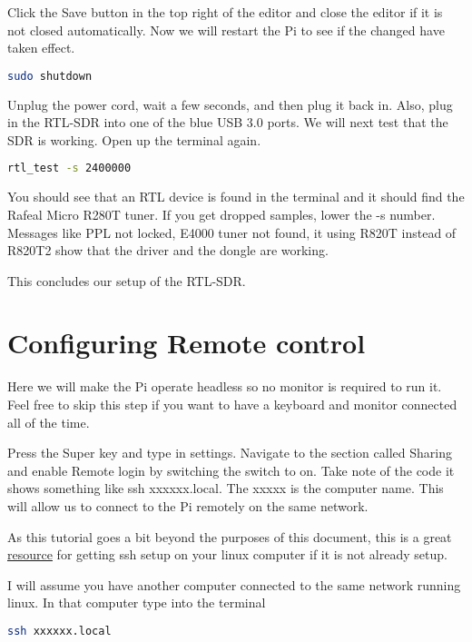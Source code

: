 \documentclass[letterpaper,12pt,notitlepage]{report} %
\begin{document}
Click the Save button in the top right of the editor and close the editor if it is not closed automatically. Now we will restart the Pi to see if the changed have taken effect.

\begin{lstlisting}[language=bash]
	sudo shutdown
\end{lstlisting}

Unplug the power cord, wait a few seconds, and then plug it back in. Also, plug in the RTL-SDR into one of the blue USB 3.0 ports. We will next test that the SDR is working. Open up the terminal again.

\begin{lstlisting}[language=bash]
	rtl_test -s 2400000
\end{lstlisting}

You should see that an RTL device is found in the terminal and it should find the Rafeal Micro R280T tuner. If you get dropped samples, lower the -s number. Messages like PPL not locked, E4000 tuner not found, it using R820T instead of R820T2 show that the driver and the dongle are working.

This concludes our setup of the RTL-SDR. 

\section{Configuring Remote control}

Here we will make the Pi operate headless so no monitor is required to run it. Feel free to skip this step if you want to have a keyboard and monitor connected all of the time.

Press the Super key and type in settings. Navigate to the section called Sharing and enable Remote login by switching the switch to on. Take note of the code it shows something like ssh xxxxxx.local. The xxxxx is the computer name. This will allow us to connect to the Pi remotely on the same network.

As this tutorial goes a bit beyond the purposes of this document, this is a great \href{https://phoenixnap.com/kb/ssh-to-connect-to-remote-server-linux-or-windows}{resource} for getting ssh setup on your linux computer if it is not already setup.

I will assume you have another computer connected to the same network running linux. In that computer type into the terminal

\begin{lstlisting}[language=bash]
	ssh xxxxxx.local
\end{lstlisting}
\end{document}
